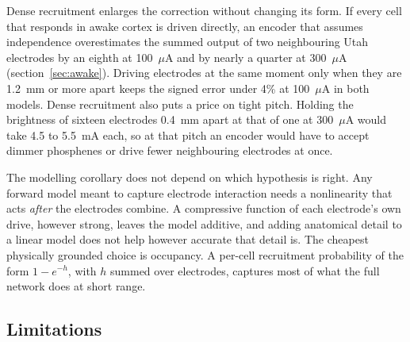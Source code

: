 \documentclass[10pt,twocolumn]{article}
\newcommand{\uA}{\ensuremath{\mu\text{A}}}
\begin{document}
Dense recruitment enlarges the correction without changing its form. If
every cell that responds in awake cortex is driven directly, an encoder
that assumes independence overestimates the summed output of two
neighbouring Utah electrodes by an eighth at 100~\uA{} and by nearly a
quarter at 300~\uA{} (section~\ref{sec:awake}). Driving electrodes at
the same moment only when they are 1.2~mm or more apart keeps the signed
error under 4\% at 100~\uA{} in both models. Dense recruitment also puts
a price on tight pitch. Holding the brightness of sixteen electrodes
0.4~mm apart at that of one at 300~\uA{} would take 4.5 to 5.5~mA each,
so at that pitch an encoder would have to accept dimmer phosphenes or
drive fewer neighbouring electrodes at once.

The modelling corollary does not depend on which hypothesis is right. Any
forward model meant to capture electrode interaction needs a nonlinearity
that acts \emph{after} the electrodes combine. A compressive function of
each electrode's own drive, however strong, leaves the model additive, and
adding anatomical detail to a linear model does not help however accurate
that detail is. The cheapest physically grounded choice is occupancy. A
per-cell recruitment probability of the form $1-e^{-h}$, with $h$ summed
over electrodes, captures most of what the full network does at short
range.

\subsection{Limitations}
\end{document}
